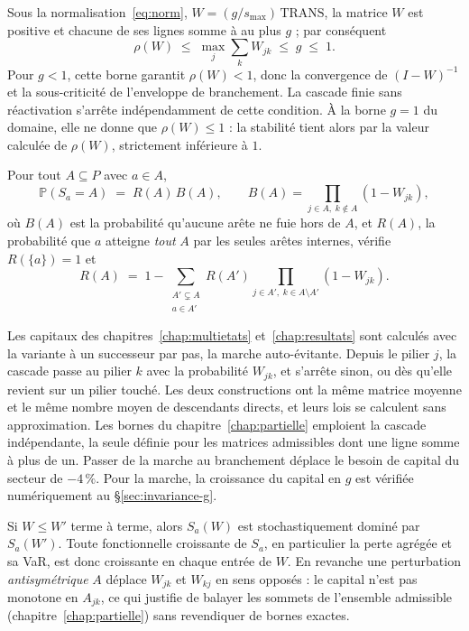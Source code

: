 \begin{proposition}
\label{prop:leontief}
Sous la normalisation~\eqref{eq:norm}, $W=(g/s_{\max})\,\mathrm{TRANS}$, la matrice $W$ est
positive et chacune de ses lignes somme à au plus $g$ ; par conséquent
\[
  \rho(W)\;\le\;\max_j\sum_k W_{jk}\;\le\;g\;\le\;1 .
\]
Pour $g<1$, cette borne garantit $\rho(W)<1$, donc la convergence de $(I-W)^{-1}$ et la sous-criticité de l'enveloppe de branchement. La cascade finie sans réactivation s'arrête indépendamment de cette condition. À la borne $g=1$ du domaine, elle ne donne que $\rho(W)\le 1$ : la stabilité tient
alors par la valeur calculée de $\rho(W)$, strictement inférieure à $1$.
\end{proposition}

\begin{proposition}
\label{prop:loi}
Pour tout $A\subseteq P$ avec $a\in A$,
\[
  \mathbb P(S_a=A)\;=\;R(A)\,B(A),\qquad
  B(A)=\!\!\prod_{j\in A,\;k\notin A}\!\!(1-W_{jk}),
\]
où $B(A)$ est la probabilité qu'aucune arête ne fuie hors de $A$, et $R(A)$, la probabilité
que $a$ atteigne \emph{tout} $A$ par les seules arêtes internes, vérifie $R(\{a\})=1$ et
\[
  R(A)\;=\;1-\sum_{\substack{A'\subsetneq A\\ a\in A'}} R(A')\!\!\prod_{j\in A',\;k\in A\setminus A'}\!\!(1-W_{jk}).
\]
\end{proposition}

\noindent Les capitaux des chapitres~\ref{chap:multietats} et~\ref{chap:resultats} sont calculés avec la variante à un successeur par pas, la marche
auto-évitante. Depuis le pilier $j$, la cascade passe au pilier $k$ avec la probabilité $W_{jk}$, et
s'arrête sinon, ou dès qu'elle revient sur un pilier touché. Les deux constructions ont la même
matrice moyenne et le même nombre moyen de descendants directs, et leurs lois se calculent
sans approximation. Les bornes du chapitre~\ref{chap:partielle} emploient la cascade indépendante, la
seule définie pour les matrices admissibles dont une ligne somme à plus de un. Passer de la marche au branchement déplace le besoin de capital du secteur de $-4\,\%$. Pour la marche, la
croissance du capital en $g$ est vérifiée numériquement au \S\ref{sec:invariance-g}.

\begin{proposition}
\label{prop:mono}
Si $W\le W'$ terme à terme, alors $S_a(W)$ est stochastiquement dominé par $S_a(W')$. Toute
fonctionnelle croissante de $S_a$, en particulier la perte agrégée et sa VaR, est donc
croissante en chaque entrée de $W$. En revanche une perturbation \emph{antisymétrique}
$A$ déplace $W_{jk}$ et $W_{kj}$ en sens opposés : le capital n'est pas monotone en $A_{jk}$,
ce qui justifie de balayer les sommets de l'ensemble admissible
(chapitre~\ref{chap:partielle}) sans revendiquer de bornes exactes.
\end{proposition}

